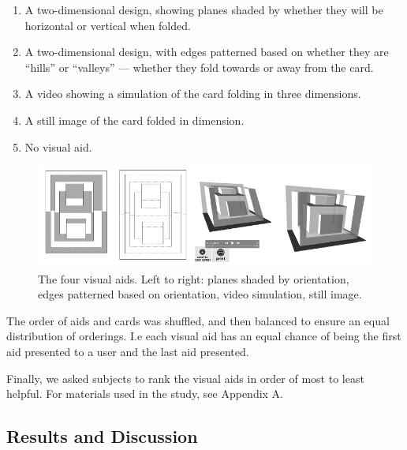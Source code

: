 \begin{enumerate}
\def\labelenumi{\arabic{enumi})}
\itemsep1pt\parskip0pt
\item
  A two-dimensional design, showing planes shaded by whether they will
  be horizontal or vertical when folded.
\item
  A two-dimensional design, with edges patterned based on whether they
  are ``hills'' or ``valleys'' --- whether they fold towards or away
  from the card.
\item
  A video showing a simulation of the card folding in three dimensions.
\item
  A still image of the card folded in dimension.
\item
  No visual aid.
\end{enumerate}

\begin{figure}[htbp]
\centering
\includegraphics{figures/51_User_Study_Visual_Aids/visualAids.pdf}
\caption{The four visual aids. Left to right: planes shaded by
orientation, edges patterned based on orientation, video simulation,
still image.}
\end{figure}

The order of aids and cards was shuffled, and then balanced to ensure an
equal distribution of orderings. I.e each visual aid has an equal chance
of being the first aid presented to a user and the last aid presented.

Finally, we asked subjects to rank the visual aids in order of most to
least helpful. For materials used in the study, see Appendix A.

\subsection{Results and Discussion}\label{results-and-discussion}


